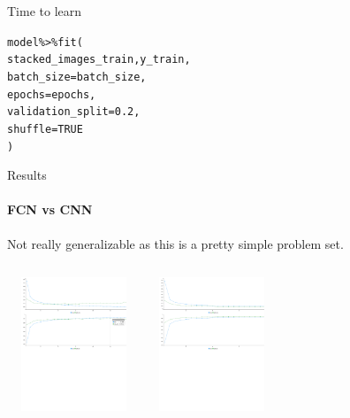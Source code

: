 \documentclass{beamer}
\begin{document}
\begin{darkframes}
\begin{frame}{Time to learn}
\begin{block}
{\begin{alltt}
          model \%>\% fit( \\
            stacked\_images\_train, y\_train, \\
            batch\_size = batch\_size, \\
            epochs = epochs, \\
            validation\_split = 0.2, \\
            shuffle = TRUE \\
          )
        \end{alltt}}
      \end{block}
    \end{frame}
    
        \begin{frame}{Results}
      \framesubtitle{FCN vs CNN}
      \begin{block}
      {\small{Not really generalizable as this is a pretty simple problem set.}}
      \end{block}
      \begin{columns}[onlytextwidth]
            \includegraphics[width=4cm, height=4cm]{2D_FCN_mnist.pdf}
            \includegraphics[width=4cm, height=4cm]{2D_CNN_mnist.pdf}
    \end{columns}
    \end{frame}
    

\end{darkframes}
\end{document}
